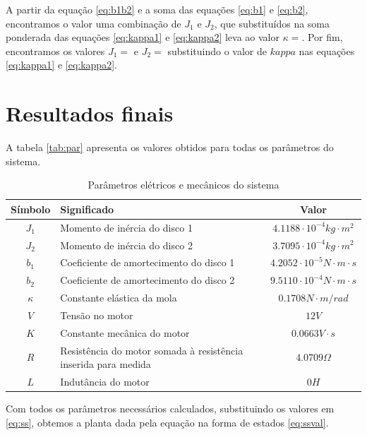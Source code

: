 \documentclass{article}
\begin{document}
A partir da equação \ref{eq:b1b2} e a soma das equações \ref{eq:b1} e \ref{eq:b2}, encontramos o valor uma combinação de $J_1$ e $J_2$, que substituídos na soma ponderada das equações \ref{eq:kappa1} e \ref{eq:kappa2} leva ao valor $\kappa=%
$. Por fim, encontramos os valores $J_1=%
$ e $J_2=%
$ substituindo o valor de $kappa$ nas equações \ref{eq:kappa1} e \ref{eq:kappa2}.

\section{Resultados finais}
A tabela \ref{tab:par} apresenta os valores obtidos para todas os parâmetros do sistema.
\begin{table}[H]
	\centering
	\caption{Parâmetros elétricos e mecânicos do sistema}
	\label{tab:valores}
	\begin{tabular}{|c|l|c|}
		\hline Símbolo & Significado & Valor \\ 
		\hline $J_1$ & Momento de inércia do disco 1 & $4.1188\cdot10^{-4}kg\cdot m^2$\\ 
		\hline $J_2$ & Momento de inércia do disco 2 & $3.7095\cdot10^{-4}kg\cdot m^2$\\
		\hline $b_1$ & Coeficiente de amortecimento do disco 1 & $4.2052\cdot10^{-5}N\cdot m\cdot s$\\
		\hline $b_2$ & Coeficiente de amortecimento do disco 2 & $9.5110\cdot10^{-4}N\cdot m\cdot s$\\ 	 
		\hline $\kappa$ & Constante elástica da mola & $0.1708N\cdot m/rad$\\ 
		\hline $V$ & Tensão no motor & $12V$\\ 
		\hline $K$ & Constante mecânica do motor & $0.0663 V \cdot s$\\ 
		\hline $R$ & Resistência do motor somada à resistência inserida para medida & $4.0709\Omega$ \\
		\hline $L$ & Indutância do motor & $0H$ \\ 	
		\hline 
	\end{tabular} 
\end{table}

Com todos os parâmetros necessários calculados, substituindo os valores em \ref{eq:ss}, obtemos a planta dada pela equação na forma de estados \ref{eq:ssval}.
\end{document}
